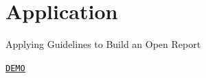 \documentclass{beamer}
\def\gray{\color{lightgray}}
\def\red{\color{red}}
\def\black{\color{black}}
\def\blue{\color{blue}}
\begin{document}

\section{Application}




\begin{frame}[label=demo]{Applying Guidelines to Build an Open Report}
\begin{center}

{\Huge
\texttt{\href{https://rpubs.com/fhoces/dd_cbo_mw}{{\blue\underline{DEMO}}}}
}


\end{center}


\end{frame}
\end{document}
